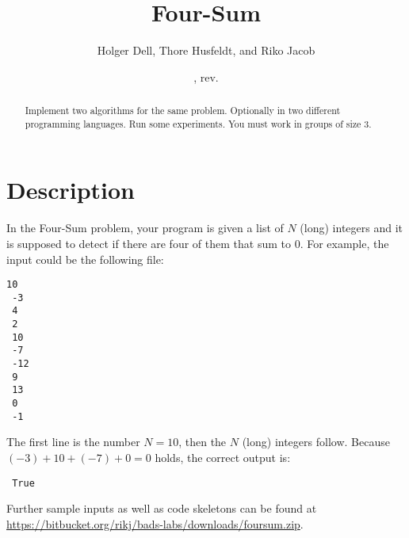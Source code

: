\documentclass{tufte-handout}
\title{Four-Sum}
\author{Holger Dell, Thore Husfeldt, and Riko Jacob}
\date{\GITAuthorDate, rev. \GITAbrHash}
\begin{document}
\maketitle
\begin{abstract}
  Implement two algorithms for the same problem.
  Optionally in two different programming languages.
  Run some experiments.
  You must work in groups of size 3.
\end{abstract}


 \section{Description}

 In the Four-Sum problem, your program is given a list of $N$ (long) integers and it is supposed to detect if there are four of them that sum to $0$.
 For example, the input could be the following file:
 \begin{lstlisting}[language=None]
 10
 -3
 4
 2
 10
 -7
 -12
 9
 13
 0
 -1
 \end{lstlisting}
 The first line is the number $N=10$, then the $N$ (long) integers follow.
 Because $(-3)+10+(-7)+0 = 0$ holds, the correct output is:
 \begin{lstlisting}
 True
 \end{lstlisting}

 Further sample inputs as well as code skeletons can be found at \url{https://bitbucket.org/rikj/bads-labs/downloads/foursum.zip}.
\end{document}
